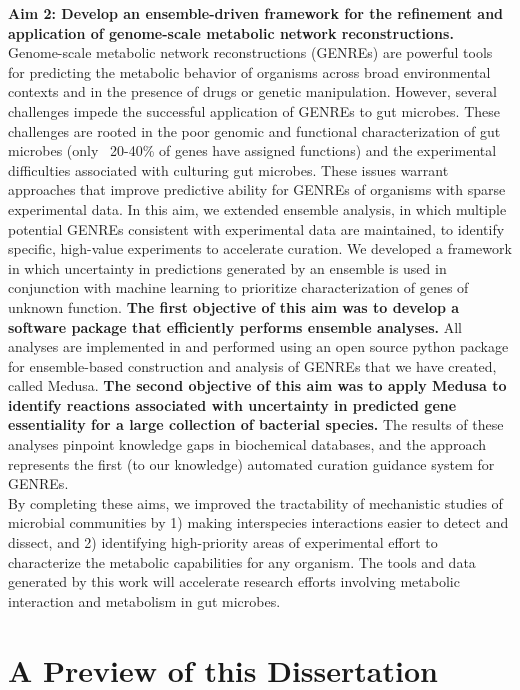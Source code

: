 \documentclass[11pt,twocolumn,notitlepage,openany,twoside]{book}
\begin{document}
\begin{refsection}
\textbf{Aim 2: Develop an ensemble-driven framework for the refinement and application of genome-scale metabolic network reconstructions.} Genome-scale metabolic network reconstructions (GENREs) are powerful tools for predicting the metabolic behavior of organisms across broad environmental contexts and in the presence of drugs or genetic manipulation. However, several challenges impede the successful application of GENREs to gut microbes. These challenges are rooted in the poor genomic and functional characterization of gut microbes (only ~20-40\% of genes have assigned functions) and the experimental difficulties associated with culturing gut microbes. These issues warrant approaches that improve predictive ability for GENREs of organisms with sparse experimental data. In this aim, we extended ensemble analysis, in which multiple potential GENREs consistent with experimental data are maintained, to identify specific, high-value experiments to accelerate curation. We developed a framework in which uncertainty in predictions generated by an ensemble is used in conjunction with machine learning to prioritize characterization of genes of unknown function. \textbf{The first objective of this aim was to develop a software package that efficiently performs ensemble analyses.} All analyses are implemented in and performed using an open source python package for ensemble-based construction and analysis of GENREs that we have created, called Medusa. \textbf{The second objective of this aim was to apply Medusa to identify reactions associated with uncertainty in predicted gene essentiality for a large collection of bacterial species.} The results of these analyses pinpoint knowledge gaps in biochemical databases, and the approach represents the first (to our knowledge) automated curation guidance system for GENREs.\\[12pt]

By completing these aims, we improved the tractability of mechanistic studies of microbial communities by 1) making interspecies interactions easier to detect and dissect, and 2) identifying high-priority areas of experimental effort to characterize the metabolic capabilities for any organism. The tools and data generated by this work will accelerate research efforts involving metabolic interaction and metabolism in gut microbes.

\section{A Preview of this Dissertation}


\end{refsection}
\end{document}
